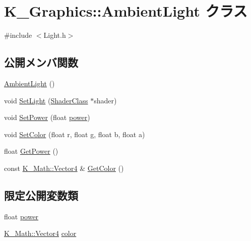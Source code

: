 \hypertarget{class_k___graphics_1_1_ambient_light}{}\section{K\+\_\+\+Graphics\+:\+:Ambient\+Light クラス}
\label{class_k___graphics_1_1_ambient_light}


{\ttfamily \#include $<$Light.\+h$>$}

\subsection*{公開メンバ関数}
\begin{DoxyCompactItemize}
\item 
\mbox{\hyperlink{class_k___graphics_1_1_ambient_light_aed22ac89d7358c674ef23bdf2ad1e07b}{Ambient\+Light}} ()
\item 
void \mbox{\hyperlink{class_k___graphics_1_1_ambient_light_af990cb426bd0af248fe2584b46cc6781}{Set\+Light}} (\mbox{\hyperlink{class_k___graphics_1_1_shader_class}{Shader\+Class}} $\ast$shader)
\item 
void \mbox{\hyperlink{class_k___graphics_1_1_ambient_light_a655a8ce910366da4101934750aaf384e}{Set\+Power}} (float \mbox{\hyperlink{class_k___graphics_1_1_ambient_light_a94be03efb22dd26f3b99acc6858491bd}{power}})
\item 
void \mbox{\hyperlink{class_k___graphics_1_1_ambient_light_a9843ba2af23cf26e2a924bb858452b0f}{Set\+Color}} (float r, float g, float b, float a)
\item 
float \mbox{\hyperlink{class_k___graphics_1_1_ambient_light_a6a06b70f058983367e1f444ca2d93ef1}{Get\+Power}} ()
\item 
const \mbox{\hyperlink{namespace_k___math_a8d82de9de17eae460600de1e40e8a01f}{K\+\_\+\+Math\+::\+Vector4}} \& \mbox{\hyperlink{class_k___graphics_1_1_ambient_light_a0d6c492ee889625cd009f08284e8c586}{Get\+Color}} ()
\end{DoxyCompactItemize}
\subsection*{限定公開変数類}
\begin{DoxyCompactItemize}
\item 
float \mbox{\hyperlink{class_k___graphics_1_1_ambient_light_a94be03efb22dd26f3b99acc6858491bd}{power}}
\item 
\mbox{\hyperlink{namespace_k___math_a8d82de9de17eae460600de1e40e8a01f}{K\+\_\+\+Math\+::\+Vector4}} \mbox{\hyperlink{class_k___graphics_1_1_ambient_light_ab1122a784c5ec44b828ace7013d1d7c8}{color}}
\end{DoxyCompactItemize}


